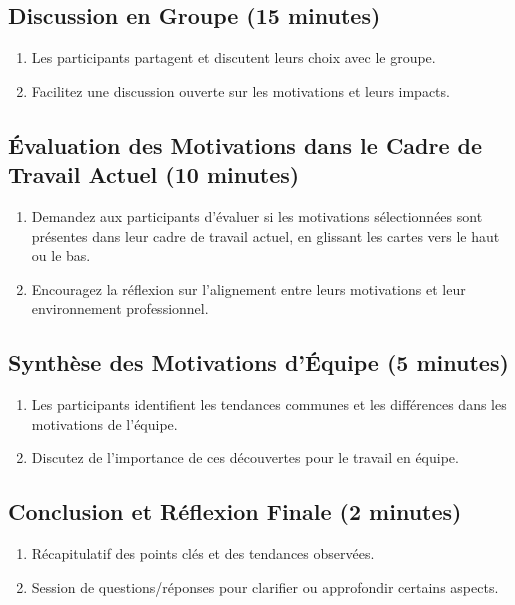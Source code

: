 \documentclass[oneside, a5paper, 12pt]{book}
\begin{document}
\subsection*{Discussion en Groupe (15 minutes)}
\begin{enumerate}
	\item Les participants partagent et discutent leurs choix avec le groupe.
	\item Facilitez une discussion ouverte sur les motivations et leurs impacts.
\end{enumerate}

\subsection*{Évaluation des Motivations dans le Cadre de Travail Actuel (10 minutes)}
\begin{enumerate}
	\item Demandez aux participants d'évaluer si les motivations sélectionnées sont présentes dans leur cadre de travail actuel, en glissant les cartes vers le haut ou le bas.
	\item Encouragez la réflexion sur l'alignement entre leurs motivations et leur environnement professionnel.
\end{enumerate}

\subsection*{Synthèse des Motivations d'Équipe (5 minutes)}
\begin{enumerate}
	\item Les participants identifient les tendances communes et les différences dans les motivations de l'équipe.
	\item Discutez de l'importance de ces découvertes pour le travail en équipe.
\end{enumerate}

\subsection*{Conclusion et Réflexion Finale (2 minutes)}
\begin{enumerate}
	\item Récapitulatif des points clés et des tendances observées.
	\item Session de questions/réponses pour clarifier ou approfondir certains aspects.
\end{enumerate}
\end{document}
